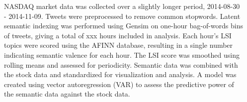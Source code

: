 \documentclass[17pt, a1paper, portrait, margin=0mm, innermargin=1mm,
     blockverticalspace=3mm, colspace=5mm, subcolspace=5mm]{tikzposter} %
\begin{document}
\begin{columns}
{    %
     \begin{tikzfigure} \label{fig:keywords}
     \end{tikzfigure}
     NASDAQ market data was collected over a slightly longer period, 2014-08-30
     - 2014-11-09. Tweets were preprocessed to remove common stopwords. Latent semantic indexing
     was performed using Gensim \cite{rehurek_lrec}  on one-hour bag-of-words bins of
     tweets, giving a total of xxx hours included in analysis. Each hour's
     LSI topics were scored using the AFINN database, resulting in a single
     number indicating semantic valence for each hour. The LSI score was
     smoothed using rolling means and assessed
     for periodicity.  Semantic data was combined with the stock data and
     standardized for
     visualization and analysis. A model was created using vector autoregression (VAR) to assess 	the predictive power of the semantic data against the
     stock data.

}
\end{columns}
\end{document}
